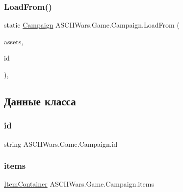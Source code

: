 \subsubsection{\texorpdfstring{Load\+From()}{LoadFrom()}}
{\footnotesize\ttfamily static \hyperlink{class_a_s_c_i_i_wars_1_1_game_1_1_campaign}{Campaign} A\+S\+C\+I\+I\+Wars.\+Game.\+Campaign.\+Load\+From (\begin{DoxyParamCaption}\item[{\hyperlink{class_a_s_c_i_i_wars_1_1_game_1_1_asset_container}{Asset\+Container}}]{assets,  }\item[{string}]{id }\end{DoxyParamCaption})\hspace{0.3cm}{\ttfamily [inline]}, {\ttfamily [static]}}



\subsection{Данные класса}
\hypertarget{class_a_s_c_i_i_wars_1_1_game_1_1_campaign_a1ef983b8a95909958e2b0fcf90f1f62f}{}\label{class_a_s_c_i_i_wars_1_1_game_1_1_campaign_a1ef983b8a95909958e2b0fcf90f1f62f} 
\subsubsection{\texorpdfstring{id}{id}}
{\footnotesize\ttfamily string A\+S\+C\+I\+I\+Wars.\+Game.\+Campaign.\+id}

\hypertarget{class_a_s_c_i_i_wars_1_1_game_1_1_campaign_a22844063638b6252dc47c327c19432fc}{}\label{class_a_s_c_i_i_wars_1_1_game_1_1_campaign_a22844063638b6252dc47c327c19432fc} 
\subsubsection{\texorpdfstring{items}{items}}
{\footnotesize\ttfamily \hyperlink{class_a_s_c_i_i_wars_1_1_game_1_1_item_container}{Item\+Container} A\+S\+C\+I\+I\+Wars.\+Game.\+Campaign.\+items}

\hypertarget{class_a_s_c_i_i_wars_1_1_game_1_1_campaign_a8d6d836c7cd3c524f1f01b2eedba5619}{}\label{class_a_s_c_i_i_wars_1_1_game_1_1_campaign_a8d6d836c7cd3c524f1f01b2eedba5619} 
